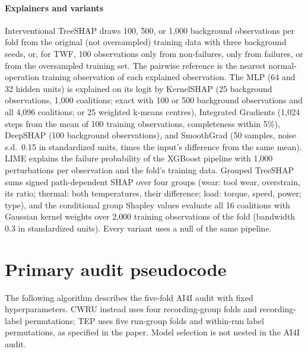 \documentclass[10pt]{article}
\begin{document}
\paragraph{Explainers and variants} Interventional TreeSHAP draws 100, 500, or 1{,}000 background observations per fold from the original (not oversampled) training data with three background seeds, or, for TWF, 100 observations only from non-failures, only from failures, or from the oversampled training set. The pairwise reference is the nearest normal-operation training observation of each explained observation. The MLP (64 and 32 hidden units) is explained on its logit by KernelSHAP (25 background observations, 1{,}000 coalitions; exact with 100 or 500 background observations and all 4{,}096 coalitions; or 25 weighted k-means centres), Integrated Gradients (1{,}024 steps from the mean of 100 training observations, completeness within 5\%), DeepSHAP (100 background observations), and SmoothGrad (50 samples, noise s.d.\ 0.15 in standardized units, times the input's difference from the same mean). LIME explains the failure probability of the XGBoost pipeline with 1{,}000 perturbations per observation and the fold's training data. Grouped TreeSHAP sums signed path-dependent SHAP over four groups (wear: tool wear, overstrain, its ratio; thermal: both temperatures, their difference; load: torque, speed, power; type), and the conditional group Shapley values evaluate all 16 coalitions with Gaussian kernel weights over 2{,}000 training observations of the fold (bandwidth 0.3 in standardized units). Every variant uses a null of the same pipeline.

\section{Primary audit pseudocode}

The following algorithm describes the five-fold AI4I audit with fixed hyperparameters. CWRU instead uses four recording-group folds and recording-label permutations; TEP uses five run-group folds and within-run label permutations, as specified in the paper. Model selection is not nested in the AI4I audit.
\end{document}
